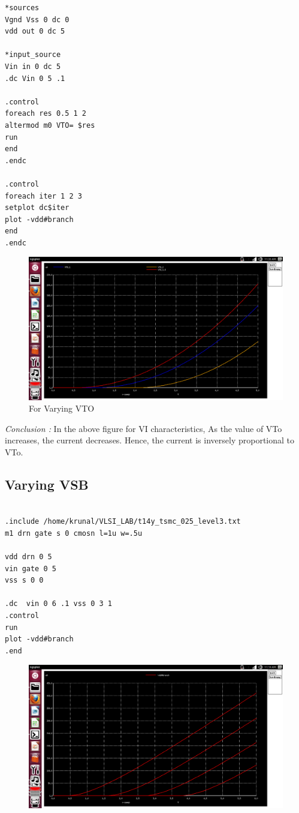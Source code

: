 \documentclass[12pt,a4paper]{article}
\begin{document}
\begin{center}
\begin{lstlisting}
*sources
Vgnd Vss 0 dc 0
vdd out 0 dc 5

*input_source
Vin in 0 dc 5
.dc Vin 0 5 .1

.control
foreach res 0.5 1 2
altermod m0 VTO= $res
run
end
.endc

.control
foreach iter 1 2 3
setplot dc$iter
plot -vdd#branch
end
.endc
\end{lstlisting}
\begin{figure}[!ht]
\centering
\includegraphics[scale=0.3]{vary_VTO.png}

\caption[Short]{For Varying VTO}
\end{figure}
\vspace{3pt}
\textit{Conclusion :}  In the above figure for VI characteristics, As the value of  VTo increases, the current decreases. Hence, the current is inversely proportional to VTo. \\
\vspace{3pt}
\subsection{Varying VSB}

\begin{lstlisting}

.include /home/krunal/VLSI_LAB/t14y_tsmc_025_level3.txt
m1 drn gate s 0 cmosn l=1u w=.5u

vdd drn 0 5
vin gate 0 5
vss s 0 0

.dc  vin 0 6 .1 vss 0 3 1
.control
run 
plot -vdd#branch
.end

\end{lstlisting}
\begin{figure}[!ht]
\centering
\includegraphics[scale=0.34]{VSB_vary.png}


\end{figure}
\end{center}
\end{document}
